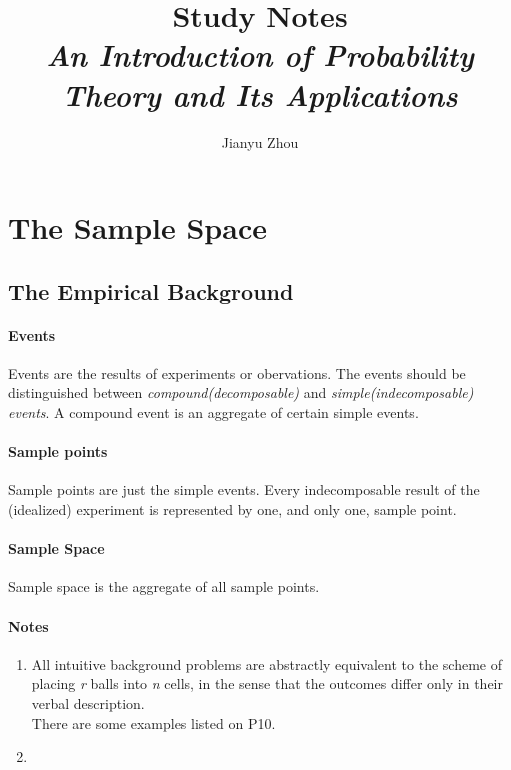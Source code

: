 \documentclass{article}
\author{Jianyu Zhou}
\title{\textbf{Study Notes}\\ \textit{An Introduction of Probability Theory and Its Applications}}
\begin{document}
	\maketitle
	\section{The Sample Space}
	\subsection{The Empirical Background}
	\paragraph{Events} Events are the results of experiments or obervations.
	The events should be distinguished between \textit{compound(decomposable)} and \textit{simple(indecomposable) events}. A compound event is an aggregate of certain simple events.
	\paragraph{Sample points} Sample points are just the simple events. Every indecomposable result of the (idealized) experiment is represented by one, and only one, sample point.
	\paragraph{Sample Space} Sample space is the aggregate of all sample points.
	\paragraph{Notes} 
	\begin{enumerate} 
	\item All intuitive background problems are abstractly equivalent to the scheme of placing \textit{r} balls into \textit{n} cells, in the sense that the outcomes differ only in their verbal description. \\There are some examples listed on P10.
	\item
	\end{enumerate}
\end{document}
